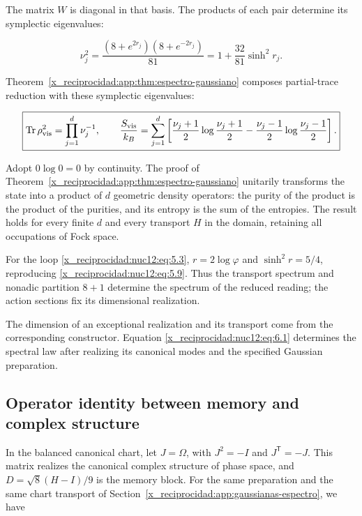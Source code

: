 The matrix \(W\) is diagonal in that basis. The products of each pair determine its symplectic eigenvalues:



\begin{equation}
\boxed{\nu_j^2=
\frac{(8+e^{2r_j})(8+e^{-2r_j})}{81}
=1+\frac{32}{81}\sinh^2r_j.}
\label{x_reciprocidad:nuc12:eq:6.1}
\end{equation}



Theorem~\ref{x_reciprocidad:app:thm:espectro-gaussiano} composes partial-trace reduction with these symplectic eigenvalues:



\begin{equation}
\boxed{\operatorname{Tr}\rho_{\rm vis}^2=\prod_{j=1}^d\nu_j^{-1},
\qquad
\frac{S_{\rm vis}}{k_B}=\sum_{j=1}^d
\left[\frac{\nu_j+1}{2}\log\frac{\nu_j+1}{2}
-\frac{\nu_j-1}{2}\log\frac{\nu_j-1}{2}\right].}
\label{x_reciprocidad:nuc12:eq:6.2}
\end{equation}



Adopt \(0\log0=0\) by continuity. The proof of Theorem~\ref{x_reciprocidad:app:thm:espectro-gaussiano} unitarily transforms the state into a product of \(d\) geometric density operators: the purity of the product is the product of the purities, and its entropy is the sum of the entropies. The result holds for every finite \(d\) and every transport \(H\) in the domain, retaining all occupations of Fock space.

For the loop \eqref{x_reciprocidad:nuc12:eq:5.3}, \(r=2\log\varphi\) and \(\sinh^2r=5/4\), reproducing \eqref{x_reciprocidad:nuc12:eq:5.9}. Thus the transport spectrum and nonadic partition \(8+1\) determine the spectrum of the reduced reading; the action sections fix its dimensional realization.

The dimension of an exceptional realization and its transport come from the corresponding constructor. Equation \eqref{x_reciprocidad:nuc12:eq:6.1} determines the spectral law after realizing its canonical modes and the specified Gaussian preparation.

\subsection{Operator identity between memory and complex structure}

In the balanced canonical chart, let \(J=\Omega\), with \(J^2=-I\) and \(J^{\mathsf T}=-J\). This matrix realizes the canonical complex structure of phase space, and \(D=\sqrt8(H-I)/9\) is the memory block. For the same preparation and the same chart transport of Section~\ref{x_reciprocidad:app:gaussianas-espectro}, we have



